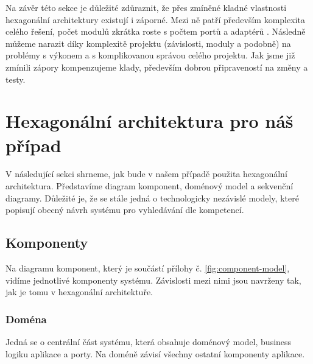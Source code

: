 Na závěr této sekce je důležité zdůraznit, že přes zmíněné kladné vlastnosti hexagonální architektury existují i záporné. Mezi ně patří především komplexita celého řešení, počet modulů zkrátka roste s počtem portů a adaptérů \cite{hexagonal-this}. Následně můžeme narazit díky komplexitě projektu (závislosti, moduly a podobně) na problémy s výkonem \cite{hexagonal-this} a s komplikovanou správou celého projektu. Jak jsme již zmínili zápory kompenzujeme klady, především dobrou připraveností na změny a testy.

\section{Hexagonální architektura pro náš případ}
V následující sekci shrneme, jak bude v našem případě použita hexagonální architektura. Představíme diagram komponent, doménový model a sekvenční diagramy. Důležité je, že se stále jedná o technologicky nezávislé modely, které popisují obecný návrh systému pro vyhledávání dle kompetencí.\par
\subsection{Komponenty}
Na diagramu komponent, který je součástí přílohy č. \ref{fig:component-model}, vidíme jednotlivé komponenty systému. Závislosti mezi nimi jsou navrženy tak, jak je tomu v hexagonální architektuře.
\subsubsection{Doména}
Jedná se o centrální část systému, která obsahuje doménový model, business logiku aplikace a porty. Na doméně závisí všechny ostatní komponenty aplikace.\par
